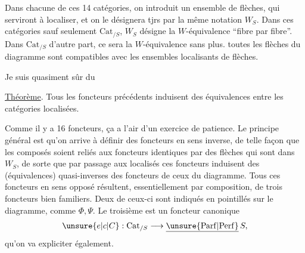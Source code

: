 Dans chacune de ces 14 catégories, on
introduit un ensemble de flèches, qui
serviront à localiser, et on le désignera tjrs
par la même notation $W_S$. Dans 
ces catégories sauf seulement $\mathrm{Cat}_{/S}$, 
$W_S$ désigne la $W$-équivalence ``fibre par fibre''.
Dans $\mathrm{Cat}_{/S}$ d'autre part, ce sera la
$W$-équivalence sans plus. toutes les flèches
du diagramme  sont compatibles avec les
ensembles localisants de flèches.

Je suis quasiment sûr du

\uline{Théorème}. Tous les foncteurs précédents induisent
des équivalences entre les catégories localisées.

Comme il y a 16 foncteurs, ça a l'air
d'un exercice de patience. Le principe général
est qu'on arrive à définir des foncteurs en
sens inverse,  de telle façon que les composés
soient  reliés aux foncteurs identiques par
des flèches qui sont dans $W_S$, de sorte
que  par passage aux localisés ces foncteurs
induisent des (équivalences) quasi-inverses des
foncteurs  de ceux du diagramme.
Tous ces foncteurs en sens opposé résultent,
essentiellement par composition, de trois foncteurs
bien familiers. Deux de ceux-ci sont
indiqués en pointillés sur le diagramme, comme $\Phi,\Psi$.
Le troisième est un foncteur canonique
\[
\unsure{e|c|C}:\mathrm{Cat}_{/S}\longrightarrow\underline{\unsure{\mathrm{Parf}|\mathrm{Perf}}}\,S,
\]
qu'on va expliciter également.

